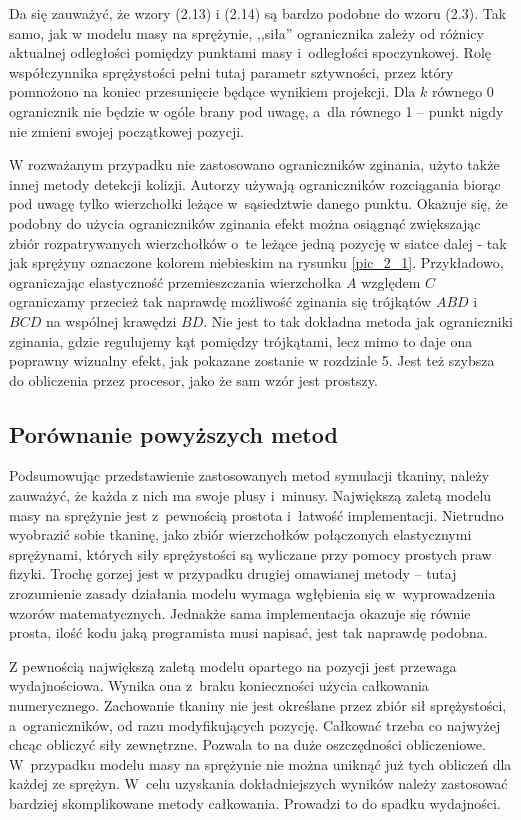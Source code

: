 			Da się zauważyć, że wzory (2.13) i (2.14) są bardzo podobne do wzoru (2.3). Tak samo, jak w modelu masy na sprężynie, ,,siła'' ogranicznika zależy od różnicy aktualnej odległości pomiędzy punktami masy i~odległości spoczynkowej. Rolę współczynnika sprężystości pełni tutaj parametr sztywności, przez który pomnożono na koniec przesunięcie będące wynikiem projekcji. Dla \(k\) równego 0 ogranicznik nie będzie w ogóle brany pod uwagę, a~dla równego 1 -- punkt nigdy nie zmieni swojej początkowej pozycji.
			
			W rozważanym przypadku nie zastosowano ograniczników zginania, użyto także innej metody detekcji kolizji. Autorzy \cite{posbased} używają ograniczników rozciągania biorąc pod uwagę tylko wierzchołki leżące w~sąsiedztwie danego punktu. Okazuje się, że podobny do użycia ograniczników zginania efekt można osiągnąć zwiększając zbiór rozpatrywanych wierzchołków o~te leżące jedną pozycję w siatce dalej - tak jak sprężyny oznaczone kolorem niebieskim na rysunku \ref{pic_2_1}. Przykładowo, ograniczając elastyczność przemieszczania wierzchołka \(A\) względem \(C\) ograniczamy przecież tak naprawdę możliwość zginania się trójkątów \(ABD\) i~\(BCD\) na wspólnej krawędzi \(BD\). Nie jest to tak dokładna metoda jak ograniczniki zginania, gdzie regulujemy kąt pomiędzy trójkątami, lecz mimo to daje ona poprawny wizualny efekt, jak pokazane zostanie w rozdziale 5. Jest też szybsza do obliczenia przez procesor, jako że sam wzór jest prostszy.
		
		\subsection{Porównanie powyższych metod}
		\label{t:teoria:analiza:porownanie}
		
			Podsumowując przedstawienie zastosowanych metod symulacji tkaniny, należy zauważyć, że każda z nich ma swoje plusy i~minusy. Największą zaletą modelu masy na sprężynie jest z~pewnością prostota i~łatwość implementacji. Nietrudno wyobrazić sobie tkaninę, jako zbiór wierzchołków połączonych elastycznymi sprężynami, których siły sprężystości są wyliczane przy pomocy prostych praw fizyki. Trochę gorzej jest w przypadku drugiej omawianej metody -- tutaj zrozumienie zasady działania modelu wymaga wgłębienia się w~wyprowadzenia wzorów matematycznych. Jednakże sama implementacja okazuje się równie prosta, ilość kodu jaką programista musi napisać, jest tak naprawdę podobna.
			
			Z pewnością największą zaletą modelu opartego na pozycji jest przewaga wydajnościowa. Wynika ona z~braku konieczności użycia całkowania numerycznego. Zachowanie tkaniny nie jest określane przez zbiór sił sprężystości, a~ograniczników, od razu modyfikujących pozycję. Całkować trzeba co najwyżej chcąc obliczyć siły zewnętrzne. Pozwala to na duże oszczędności obliczeniowe. W~przypadku modelu masy na sprężynie nie można uniknąć już tych obliczeń dla każdej ze sprężyn. W~celu uzyskania dokładniejszych wyników należy zastosować bardziej skomplikowane metody całkowania. Prowadzi to do spadku wydajności.
			
